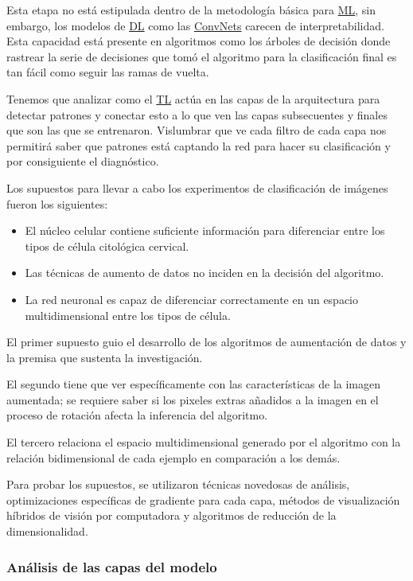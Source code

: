 Esta etapa no está estipulada dentro de la metodología básica para
\hyperlink{abbr}{ML}, sin embargo, los modelos de \hyperlink{abbr}{DL} como las
\hyperlink{abbr}{ConvNets} carecen de interpretabilidad. Esta capacidad está
presente en algoritmos como los árboles de decisión donde rastrear la serie de
decisiones que tomó el algoritmo para la clasificación final es tan fácil como
seguir las ramas de vuelta.

Tenemos que analizar como el \hyperlink{abbr}{TL} actúa en las capas de la arquitectura para
detectar patrones y conectar esto a lo que ven las capas subsecuentes y finales
que son las que se entrenaron. Vislumbrar que ve cada filtro de cada capa nos
permitirá saber que patrones está captando la red para hacer su clasificación y
por consiguiente el diagnóstico.

Los supuestos para llevar a cabo los experimentos de clasificación de imágenes
fueron los siguientes:

\begin{itemize}
  \item El núcleo celular contiene suficiente información para diferenciar entre
  los tipos de célula citológica cervical.
  \item Las técnicas de aumento de datos no inciden en la decisión del
  algoritmo.
  \item La red neuronal es capaz de diferenciar correctamente en un espacio
  multidimensional entre los tipos de célula.
\end{itemize}

El primer supuesto guio el desarrollo de los algoritmos de aumentación de datos
y la premisa que sustenta la investigación. 

El segundo tiene que ver específicamente con las características de la imagen
aumentada; se requiere saber si los pixeles extras añadidos a la imagen en el
proceso de rotación afecta la inferencia del algoritmo.

El tercero relaciona el espacio multidimensional generado por el algoritmo con
la relación bidimensional de cada ejemplo en comparación a los demás.

Para probar los supuestos, se utilizaron técnicas novedosas de análisis,
optimizaciones específicas de gradiente para cada capa, métodos de visualización
híbridos de visión por computadora y algoritmos de reducción de la
dimensionalidad.

\subsubsection{Análisis de las capas del modelo}


